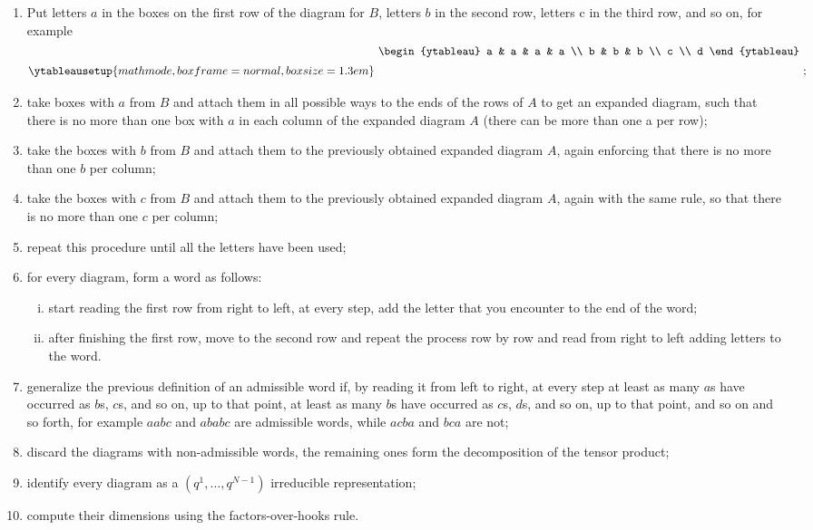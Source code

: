 \begin{enumerate}
    \item Put letters $a$ in the boxes on the first row of the diagram for $B$, letters $b$ in the second row, letters c in the third row, and so on, for example
    \begin{equation}
    \ytableausetup{mathmode, boxframe=normal, boxsize=1.3em}
    \raisebox{4ex}{
        \begin{ytableau}
        a & a & a & a \\
        b & b & b \\
        c \\
        d
        \end{ytableau}
        };
    \end{equation}
    \item take boxes with $a$ from $B$ and attach them in all possible ways to the ends of the rows of $A$ to get an expanded diagram, such that there is no more than one box with $a$ in each column of the expanded diagram $A$ (there can be more than one a per row);
    \item take the boxes with $b$ from $B$ and attach them to the previously obtained expanded diagram $A$, again enforcing that there is no more than one $b$ per column;
    \item take the boxes with $c$ from $B$ and attach them to the previously obtained expanded diagram $A$, again with the same rule, so that there is no more than one $c$ per column;
    \item repeat this procedure until all the letters have been used;
    \item for every diagram, form a word as follows: 
    \begin{enumerate}[i.]
        \item start reading the first row from right to left, at every step, add the letter that you encounter to the end of the word;
        \item after finishing the first row, move to the second row and repeat the process row by row and read from right to left adding letters to the word.
    \end{enumerate}
    \item generalize the previous definition of an admissible word if, by reading it from left to right, at every step at least as many $a$s have occurred as $b$s, $c$s, and so on, up to that point, at least as many $b$s have occurred as $c$s, $d$s, and so on, up to that point, and so on and so forth, for example $aabc$ and $ababc$ are admissible words, while $acba$ and $bca$ are not;
    \item discard the diagrams with non-admissible words, the remaining ones form the decomposition of the tensor product;
    \item identify every diagram as a $(q^1,\dots,q^{N-1})$ irreducible representation;
    \item compute their dimensions using the factors-over-hooks rule.
\end{enumerate}

